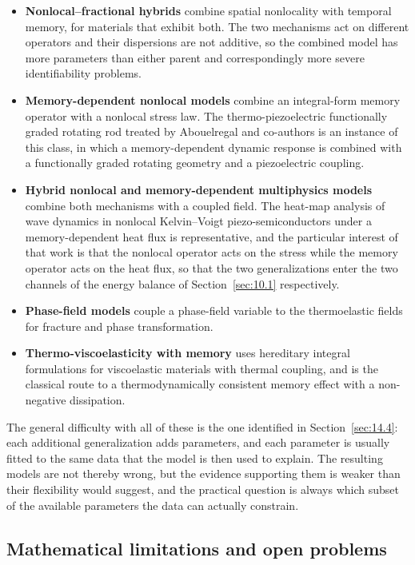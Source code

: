 \begin{itemize}
\item \textbf{Nonlocal--fractional hybrids} combine spatial nonlocality with temporal memory, for materials that exhibit both. The two mechanisms act on different operators and their dispersions are not additive, so the combined model has more parameters than either parent and correspondingly more severe identifiability problems.
\item \textbf{Memory-dependent nonlocal models} combine an integral-form memory operator with a nonlocal stress law. The thermo-piezoelectric functionally graded rotating rod treated by Abouelregal and co-authors \cite{Abouelregal2023} is an instance of this class, in which a memory-dependent dynamic response is combined with a functionally graded rotating geometry and a piezoelectric coupling.
\item \textbf{Hybrid nonlocal and memory-dependent multiphysics models} combine both mechanisms with a coupled field. The heat-map analysis of wave dynamics in nonlocal Kelvin--Voigt piezo-semiconductors under a memory-dependent heat flux \cite{Gupta2026HeatMap} is representative, and the particular interest of that work is that the nonlocal operator acts on the stress while the memory operator acts on the heat flux, so that the two generalizations enter the two channels of the energy balance of Section~\ref{sec:10.1} respectively.
\item \textbf{Phase-field models} couple a phase-field variable to the thermoelastic fields for fracture and phase transformation.
\item \textbf{Thermo-viscoelasticity with memory} uses hereditary integral formulations for viscoelastic materials with thermal coupling, and is the classical route to a thermodynamically consistent memory effect with a non-negative dissipation.
\end{itemize}

The general difficulty with all of these is the one identified in Section~\ref{sec:14.4}: each additional generalization adds parameters, and each parameter is usually fitted to the same data that the model is then used to explain. The resulting models are not thereby wrong, but the evidence supporting them is weaker than their flexibility would suggest, and the practical question is always which subset of the available parameters the data can actually constrain.

\subsection{Mathematical limitations and open problems}
\label{sec:11.5}

